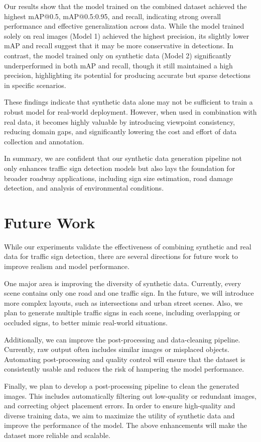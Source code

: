 \documentclass[journal]{IEEEtran}
\begin{document}
Our results show that the model trained on the combined dataset achieved the highest mAP@0.5, mAP@0.5:0.95, and recall, indicating strong overall performance and effective generalization across data. While the model trained solely on real images (Model 1) achieved the highest precision, its slightly lower mAP and recall suggest that it may be more conservative in detections. In contrast, the model trained only on synthetic data (Model 2) significantly underperformed in both mAP and recall, though it still maintained a high precision, highlighting its potential for producing accurate but sparse detections in specific scenarios.

These findings indicate that synthetic data alone may not be sufficient to train a robust model for real-world deployment. However, when used in combination with real data, it becomes highly valuable by introducing viewpoint consistency, reducing domain gaps, and significantly lowering the cost and effort of data collection and annotation.

In summary, we are confident that our synthetic data generation pipeline not only enhances traffic sign detection models but also lays the foundation for broader roadway applications, including sign size estimation, road damage detection, and analysis of environmental conditions.

\section{Future Work}
While our experiments validate the effectiveness of combining synthetic and real data for traffic sign detection, there are several directions for future work to improve realism and model performance.

One major area is improving the diversity of synthetic data. Currently, every scene contains only one road and one traffic sign. In the future, we will introduce more complex layouts, such as intersections and urban street scenes. Also, we plan to generate multiple traffic signs in each scene, including overlapping or occluded signs, to better mimic real-world situations.

Additionally, we can improve the post-processing and data-cleaning pipeline. Currently, raw output often includes similar images or misplaced objects. Automating post-processing and quality control will ensure that the dataset is consistently usable and reduces the risk of hampering the model performance.

Finally, we plan to develop a post-processing pipeline to clean the generated images. This includes automatically filtering out low-quality or redundant images, and correcting object placement errors. In order to ensure high-quality and diverse training data, we aim to maximize the utility of synthetic data and improve the performance of the model. The above enhancements will make the dataset more reliable and scalable.
\end{document}

